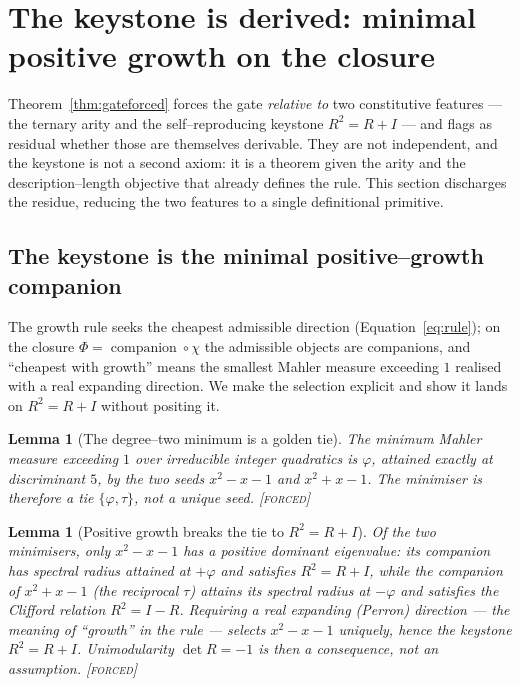 \documentclass[11pt]{article}
\theoremstyle{plain}
\newtheorem{lemma}[theorem]{Lemma}
\theoremstyle{definition}
\theoremstyle{remark}
\newcommand{\forced}{\textcolor{forcedc}{\textsc{[forced]}}}
\begin{document}
\section{The keystone is derived: minimal positive growth on the closure}\label{sec:keystone}

Theorem~\ref{thm:gateforced} forces the gate \emph{relative to} two constitutive features --- the ternary arity and the self--reproducing keystone $R^2=R+I$ --- and flags as residual whether those are themselves derivable. They are not independent, and the keystone is not a second axiom: it is a theorem given the arity and the description--length objective that already defines the rule. This section discharges the residue, reducing the two features to a single definitional primitive.

\subsection{The keystone is the minimal positive--growth companion}

The growth rule seeks the cheapest admissible direction (Equation~\eqref{eq:rule}); on the closure $\Phi=\operatorname{companion}\circ\chi$ the admissible objects are companions, and ``cheapest with growth'' means the smallest Mahler measure exceeding $1$ realised with a real expanding direction. We make the selection explicit and show it lands on $R^2=R+I$ without positing it.

\begin{lemma}[The degree--two minimum is a golden tie]\label{lem:tie}
The minimum Mahler measure exceeding $1$ over irreducible integer quadratics is $\varphi$, attained \emph{exactly} at discriminant $5$, by the two seeds $x^2-x-1$ and $x^2+x-1$. The minimiser is therefore a tie $\{\varphi,\tau\}$, not a unique seed. \forced
\end{lemma}

\begin{lemma}[Positive growth breaks the tie to $R^2=R+I$]\label{lem:perron}
Of the two minimisers, only $x^2-x-1$ has a positive dominant eigenvalue: its companion has spectral radius attained at $+\varphi$ and satisfies $R^2=R+I$, while the companion of $x^2+x-1$ (the reciprocal $\tau$) attains its spectral radius at $-\varphi$ and satisfies the Clifford relation $R^2=I-R$. Requiring a real \emph{expanding} (Perron) direction --- the meaning of ``growth'' in the rule --- selects $x^2-x-1$ uniquely, hence the keystone $R^2=R+I$. Unimodularity $\det R=-1$ is then a consequence, not an assumption. \forced
\end{lemma}
\end{document}
